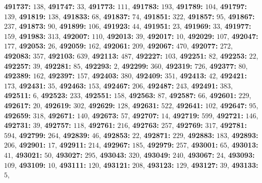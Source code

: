 \textsf{\bfseries 491737:} $138$, \textsf{\bfseries 491747:} $33$, \textsf{\bfseries 491773:} $111$, \textsf{\bfseries 491783:} $193$, \textsf{\bfseries 491789:} $104$, \textsf{\bfseries 491797:} $139$, \textsf{\bfseries 491819:} $138$, \textsf{\bfseries 491833:} $68$, \textsf{\bfseries 491837:} $74$, \textsf{\bfseries 491851:} $322$, \textsf{\bfseries 491857:} $95$, \textsf{\bfseries 491867:} $237$, \textsf{\bfseries 491873:} $90$, \textsf{\bfseries 491899:} $106$, \textsf{\bfseries 491923:} $44$, \textsf{\bfseries 491951:} $23$, \textsf{\bfseries 491969:} $33$, \textsf{\bfseries 491977:} $159$, \textsf{\bfseries 491983:} $313$, \textsf{\bfseries 492007:} $110$, \textsf{\bfseries 492013:} $39$, \textsf{\bfseries 492017:} $10$, \textsf{\bfseries 492029:} $107$, \textsf{\bfseries 492047:} $177$, \textsf{\bfseries 492053:} $26$, \textsf{\bfseries 492059:} $162$, \textsf{\bfseries 492061:} $209$, \textsf{\bfseries 492067:} $470$, \textsf{\bfseries 492077:} $272$, \textsf{\bfseries 492083:} $357$, \textsf{\bfseries 492103:} $639$, \textsf{\bfseries 492113:} $487$, \textsf{\bfseries 492227:} $103$, \textsf{\bfseries 492251:} $82$, \textsf{\bfseries 492253:} $22$, \textsf{\bfseries 492257:} $39$, \textsf{\bfseries 492281:} $85$, \textsf{\bfseries 492293:} $2$, \textsf{\bfseries 492299:} $360$, \textsf{\bfseries 492319:} $726$, \textsf{\bfseries 492377:} $80$, \textsf{\bfseries 492389:} $162$, \textsf{\bfseries 492397:} $157$, \textsf{\bfseries 492403:} $380$, \textsf{\bfseries 492409:} $351$, \textsf{\bfseries 492413:} $42$, \textsf{\bfseries 492421:} $173$, \textsf{\bfseries 492431:} $35$, \textsf{\bfseries 492463:} $153$, \textsf{\bfseries 492467:} $206$, \textsf{\bfseries 492487:} $243$, \textsf{\bfseries 492491:} $383$, \textsf{\bfseries 492511:} $6$, \textsf{\bfseries 492523:} $233$, \textsf{\bfseries 492551:} $158$, \textsf{\bfseries 492563:} $87$, \textsf{\bfseries 492587:} $66$, \textsf{\bfseries 492601:} $229$, \textsf{\bfseries 492617:} $20$, \textsf{\bfseries 492619:} $302$, \textsf{\bfseries 492629:} $128$, \textsf{\bfseries 492631:} $522$, \textsf{\bfseries 492641:} $102$, \textsf{\bfseries 492647:} $95$, \textsf{\bfseries 492659:} $318$, \textsf{\bfseries 492671:} $140$, \textsf{\bfseries 492673:} $57$, \textsf{\bfseries 492707:} $14$, \textsf{\bfseries 492719:} $599$, \textsf{\bfseries 492721:} $146$, \textsf{\bfseries 492731:} $39$, \textsf{\bfseries 492757:} $118$, \textsf{\bfseries 492761:} $216$, \textsf{\bfseries 492763:} $257$, \textsf{\bfseries 492769:} $317$, \textsf{\bfseries 492781:} $594$, \textsf{\bfseries 492799:} $264$, \textsf{\bfseries 492839:} $46$, \textsf{\bfseries 492853:} $22$, \textsf{\bfseries 492871:} $229$, \textsf{\bfseries 492883:} $183$, \textsf{\bfseries 492893:} $206$, \textsf{\bfseries 492901:} $17$, \textsf{\bfseries 492911:} $214$, \textsf{\bfseries 492967:} $185$, \textsf{\bfseries 492979:} $257$, \textsf{\bfseries 493001:} $65$, \textsf{\bfseries 493013:} $41$, \textsf{\bfseries 493021:} $50$, \textsf{\bfseries 493027:} $295$, \textsf{\bfseries 493043:} $320$, \textsf{\bfseries 493049:} $240$, \textsf{\bfseries 493067:} $24$, \textsf{\bfseries 493093:} $109$, \textsf{\bfseries 493109:} $10$, \textsf{\bfseries 493111:} $120$, \textsf{\bfseries 493121:} $208$, \textsf{\bfseries 493123:} $129$, \textsf{\bfseries 493127:} $39$, \textsf{\bfseries 493133:} $5$, 
